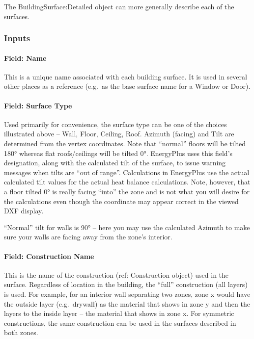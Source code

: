 The BuildingSurface:Detailed object can more generally describe each of the surfaces.

\subsubsection{Inputs}\label{inputs-23-006}

\paragraph{Field: Name}\label{field-name-19-005}

This is a unique name associated with each building surface. It is used in several other places as a reference (e.g.~as the base surface name for a Window or Door).

\paragraph{Field: Surface Type}\label{field-surface-type-000}

Used primarily for convenience, the surface type can be one of the choices illustrated above -- Wall, Floor, Ceiling, Roof. Azimuth (facing) and Tilt are determined from the vertex coordinates. Note that ``normal'' floors will be tilted 180° whereas flat roofs/ceilings will be tilted 0°. EnergyPlus uses this field's designation, along with the calculated tilt of the surface, to issue warning messages when tilts are ``out of range''. Calculations in EnergyPlus use the actual calculated tilt values for the actual heat balance calculations. Note, however, that a floor tilted 0° is really facing ``into'' the zone and is not what you will desire for the calculations even though the coordinate may appear correct in the viewed DXF display.

``Normal'' tilt for walls is 90° -- here you may use the calculated Azimuth to make sure your walls are facing away from the zone's interior.

\paragraph{Field: Construction Name}\label{field-construction-name-19}

This is the name of the construction (ref: Construction object) used in the surface. Regardless of location in the building, the ``full'' construction (all layers) is used. For example, for an interior wall separating two zones, zone x would have the outside layer (e.g.~drywall) as the material that shows in zone y and then the layers to the inside layer -- the material that shows in zone x. For symmetric constructions, the same construction can be used in the surfaces described in both zones.

